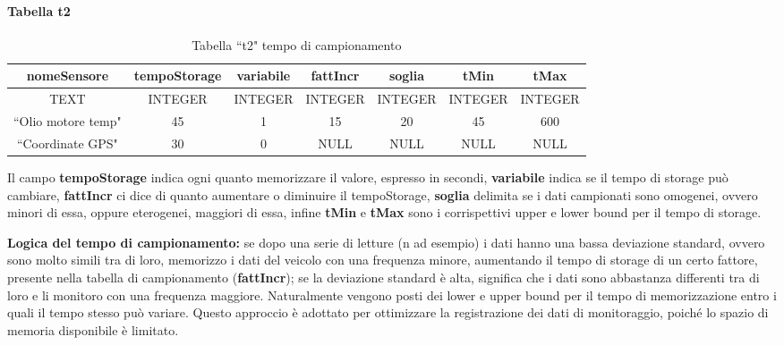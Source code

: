 \documentclass[12pt, a4paper, italian]{report}
\numberwithin{figure}{chapter}
\numberwithin{table}{chapter}
\begin{document}
\paragraph{Tabella t2}
\begin{table}[h!]
  \centering 
  \begin{adjustbox}{max width=\textwidth}
    \begin{tabular}{|c|c|c|c|c|c|c|}
      \hline
      \textbf{nomeSensore} & \textbf{tempoStorage} & \textbf{variabile} & \textbf{fattIncr} & \textbf{soglia} & \textbf{tMin} & \textbf{tMax} \\
      \hline
      TEXT & INTEGER & INTEGER & INTEGER & INTEGER & INTEGER & INTEGER \\
      \hline
      ``Olio motore temp" & 45 & 1 & 15 & 20 & 45 & 600 \\
      \hline
      ``Coordinate GPS" & 30 & 0 & NULL & NULL & NULL & NULL \\
      \hline
    \end{tabular}
  \end{adjustbox}
  \caption{Tabella ``t2" tempo di campionamento}
  \label{tab:t2 campionamento}
\end{table}
Il campo \textbf{tempoStorage} indica ogni quanto memorizzare il valore, espresso in secondi, \textbf{variabile} indica se il tempo di storage può cambiare, \textbf{fattIncr} ci dice di quanto aumentare o diminuire il tempoStorage, \textbf{soglia} delimita se i dati campionati sono omogenei, ovvero minori di essa, oppure eterogenei, maggiori di essa, infine \textbf{tMin} e \textbf{tMax} sono i corrispettivi upper e lower bound per il tempo di storage.

\textbf{Logica del tempo di campionamento:} se dopo una serie di letture (n ad esempio) i dati hanno una bassa deviazione standard, ovvero sono molto simili tra di loro, memorizzo i dati del veicolo con una frequenza minore, aumentando il tempo di storage di un certo fattore, presente nella tabella di campionamento (\textbf{fattIncr}); se la deviazione standard è alta, significa che i dati sono abbastanza differenti tra di loro e li monitoro con una frequenza maggiore. Naturalmente vengono posti dei lower e upper bound per il tempo di memorizzazione entro i quali il tempo stesso può variare. Questo approccio è adottato per ottimizzare la registrazione dei dati di monitoraggio, poiché lo spazio di memoria disponibile è limitato.
\end{document}
